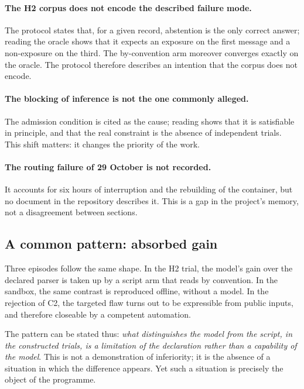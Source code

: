 \paragraph{The H2 corpus does not encode the described failure mode.} The protocol states that, for a given record, abstention is the only correct answer; reading the oracle shows that it expects an exposure on the first message and a non-exposure on the third. The by-convention arm moreover converges exactly on the oracle. The protocol therefore describes an intention that the corpus does not encode.

\paragraph{The blocking of inference is not the one commonly alleged.} The admission condition is cited as the cause; reading shows that it is satisfiable in principle, and that the real constraint is the absence of independent trials. This shift matters: it changes the priority of the work.

\paragraph{The routing failure of 29 October is not recorded.} It accounts for six hours of interruption and the rebuilding of the container, but no document in the repository describes it. This is a gap in the project's memory, not a disagreement between sections.

\subsection{A common pattern: absorbed gain}

Three episodes follow the same shape. In the H2 trial, the model's gain over the declared parser is taken up by a script arm that reads by convention. In the sandbox, the same contrast is reproduced offline, without a model. In the rejection of C2, the targeted flaw turns out to be expressible from public inputs, and therefore closeable by a competent automation.

The pattern can be stated thus: \emph{what distinguishes the model from the script, in the constructed trials, is a limitation of the declaration rather than a capability of the model}. This is not a demonstration of inferiority; it is the absence of a situation in which the difference appears. Yet such a situation is precisely the object of the programme.

